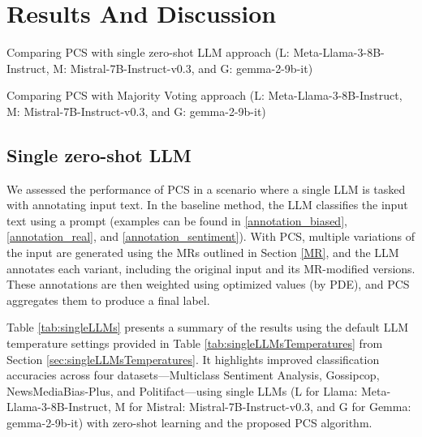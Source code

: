 \section{Results And Discussion}
\label{sec:results}

\begin{table}[t]
\centering%
\caption{Comparing PCS with single zero-shot LLM approach (L: Meta-Llama-3-8B-Instruct, M: Mistral-7B-Instruct-v0.3, and G: gemma-2-9b-it)}
\label{tab:singleLLMs}
\vskip 0.15in

{

}
\vskip -0.1in
\end{table}

\begin{table}[t]
\centering%
\caption{Comparing PCS with Majority Voting approach (L: Meta-Llama-3-8B-Instruct, M: Mistral-7B-Instruct-v0.3, and G: gemma-2-9b-it)}
\label{tab:MajorityVoting}
\vskip 0.15in

{

}
\vskip -0.1in

\end{table}

\subsection{Single zero-shot LLM}
We assessed the performance of PCS in a scenario where a single LLM is tasked with annotating input text. In the baseline method, the LLM classifies the input text using a prompt (examples can be found in \ref{annotation_biased}, \ref{annotation_real}, and \ref{annotation_sentiment}). With PCS, multiple variations of the input are generated using the MRs outlined in Section \ref{MR}, and the LLM annotates each variant, including the original input and its MR-modified versions. These annotations are then weighted using optimized values (by PDE), and PCS aggregates them to produce a final label.

Table \ref{tab:singleLLMs} presents a summary of the results using the default LLM temperature settings provided in Table \ref{tab:singleLLMsTemperatures} from Section \ref{sec:singleLLMsTemperatures}. It highlights improved classification accuracies across four datasets—Multiclass Sentiment Analysis, Gossipcop, NewsMediaBias-Plus, and Politifact—using single LLMs (L for Llama: Meta-Llama-3-8B-Instruct, M for Mistral: Mistral-7B-Instruct-v0.3, and G for Gemma: gemma-2-9b-it) with zero-shot learning and the proposed PCS algorithm. 

